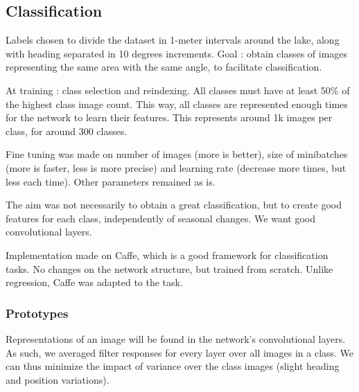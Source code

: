 \subsection{Classification}
Labels chosen to divide the dataset in 1-meter intervals around the lake, along with heading separated in 10 degrees increments. Goal : obtain classes of images representing the same area with the same angle, to facilitate classification.

At training : class selection and reindexing. All classes must have at least 50\% of the highest class image count. This way, all classes are represented enough times for the network to learn their features. This represents around 1k images per class, for around 300 classes.

Fine tuning was made on number of images (more is better), size of minibatches (more is faster, less is more precise) and learning rate (decrease more times, but less each time). Other parameters remained as is.

The aim was not necessarily to obtain a great classification, but to create good features for each class, independently of seasonal changes. We want good convolutional layers.

Implementation made on Caffe, which is a good framework for classification tasks. No changes on the network structure, but trained from scratch. Unlike regression, Caffe was adapted to the task.

\subsubsection{Prototypes}
Representations of an image will be found in the network's convolutional layers. As such, we averaged filter responses for every layer over all images in a class. We can thus minimize the impact of variance over the class images (slight heading and position variations).